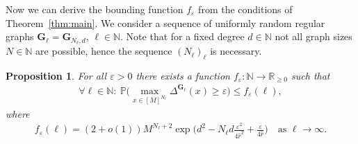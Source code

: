 \documentclass[a4paper,
               10pt,
               pdftex,
               normalheadings,
               headsepline,
               footsepline,
               headinclude,
               footinclude,
               DIV=14,
               abstracton]
{scrartcl}
\newtheorem{proposition}[theorem]{Proposition}
\newcommand{\rv}[1]{\bm{#1}}
\begin{document}
Now we can derive the bounding function $f_\varepsilon$ from the conditions of Theorem~\ref{thm:main}. We consider a sequence of uniformly random regular graphs $\rv{G}_\ell = \rv{G}_{N_\ell, d}$, $\ell \in \mathbb{N}$. Note that for a fixed degree $d\in\mathbb{N}$ not all graph sizes $N\in\mathbb{N}$ are possible, hence the sequence $(N_\ell)_{\ell}$ is necessary.
\begin{proposition} \label{prop:regular_bound}
For all $\varepsilon > 0$ there exists a function $f_\varepsilon: \mathbb{N} \to \mathbb{R}_{\geq 0}$ such that
\begin{align}
    \forall \ell \in \mathbb{N}:\ \mathbb{P}\Big(\max_{x\in [M]^{N_\ell}} \Delta^{\rv{G}_{\ell}}(x) \geq \varepsilon \Big) \leq f_\varepsilon(\ell),
\end{align}
where
\begin{align}
    f_\varepsilon(\ell) = (2+o(1)) M^{N_\ell+2} \exp\Big(d^2 - N_\ell d \frac{\varepsilon^2}{4 \hat{r}^2} + \frac{\varepsilon}{4 \hat{r}}\Big) \quad \text{as }\ell\to\infty.
\end{align}
\end{proposition}
\end{document}
